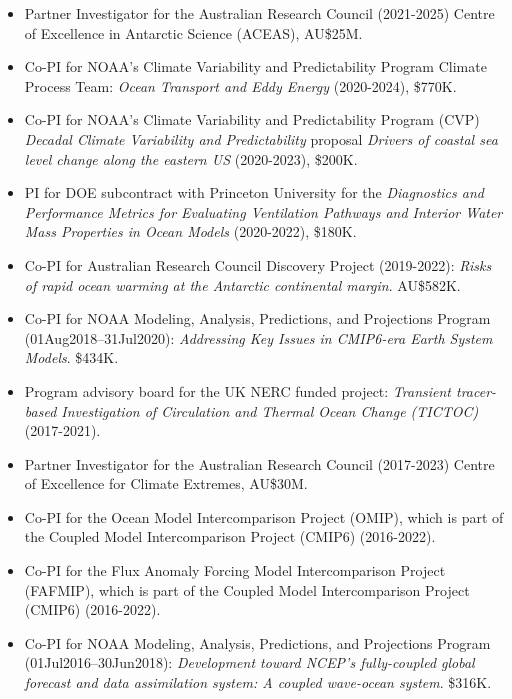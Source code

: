 \documentclass{article}
\begin{document}
\begin{itemize}[leftmargin=*]

\item Partner Investigator for the Australian Research Council (2021-2025) Centre of Excellence in Antarctic Science (ACEAS), AU\$25M.
  
\item Co-PI for NOAA's Climate Variability and Predictability Program Climate Process Team: {\it Ocean Transport and Eddy Energy} (2020-2024), \$770K.

\item Co-PI for NOAA's Climate Variability and Predictability Program (CVP) {\it Decadal Climate Variability and Predictability} proposal {\it Drivers of coastal sea level change along the eastern US} (2020-2023), \$200K.  

\item PI for DOE subcontract with Princeton University for the {\it Diagnostics and Performance Metrics for Evaluating Ventilation Pathways and Interior Water Mass Properties in Ocean Models} (2020-2022), \$180K. 

\item Co-PI for Australian Research Council Discovery Project (2019-2022): {\it Risks of rapid ocean warming at the Antarctic continental margin}. AU\$582K.

\item Co-PI for NOAA Modeling, Analysis, Predictions, and Projections Program (01Aug2018--31Jul2020): {\it Addressing Key Issues in CMIP6-era Earth System Models}. \$434K.
    
\item Program advisory board for the UK NERC funded project: {\it Transient tracer-based Investigation of Circulation and Thermal Ocean Change (TICTOC)} (2017-2021).

\item Partner Investigator for the Australian Research Council (2017-2023) Centre of Excellence for Climate Extremes, AU\$30M.
  
\item Co-PI for the Ocean Model Intercomparison Project (OMIP), which is part of the Coupled Model Intercomparison Project (CMIP6) (2016-2022).    

\item Co-PI for the Flux Anomaly Forcing Model Intercomparison Project (FAFMIP), which is part of the Coupled Model Intercomparison Project (CMIP6) (2016-2022).    

\item Co-PI for NOAA Modeling, Analysis, Predictions, and Projections Program (01Jul2016--30Jun2018): {\it Development toward NCEP's fully-coupled global forecast and data assimilation system: A coupled wave-ocean system}.  \$316K.


\end{itemize}
\end{document}

